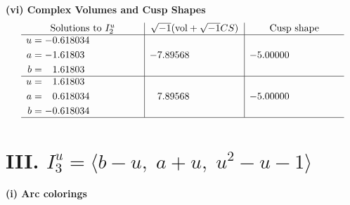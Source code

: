 \documentclass[1p]{elsarticle_modified}
\theoremstyle{definition}
\newcommand{\I}{\sqrt{-1}}
\begin{document}
\newpage\flushleft \textbf{(vi) Complex Volumes and Cusp Shapes}
$$\begin{array}{c|c|c}  
\text{Solutions to }I^u_{2}& \I (\text{vol} + \sqrt{-1}CS) & \text{Cusp shape}\\
 \hline 
\begin{aligned}
u &= -0.618034\phantom{ +0.000000I} \\
a &= -1.61803\phantom{ +0.000000I} \\
b &= \phantom{-}1.61803\phantom{ +0.000000I}\end{aligned}
 & -7.89568\phantom{ +0.000000I} & -5.00000\phantom{ +0.000000I} \\ \hline\begin{aligned}
u &= \phantom{-}1.61803\phantom{ +0.000000I} \\
a &= \phantom{-}0.618034\phantom{ +0.000000I} \\
b &= -0.618034\phantom{ +0.000000I}\end{aligned}
 & \phantom{-}7.89568\phantom{ +0.000000I} & -5.00000\phantom{ +0.000000I}\\
 \hline 
 \end{array}$$\newpage\newpage\renewcommand{\arraystretch}{1}
\centering \section*{III. $I^u_{3}= \langle b- u,\;a+u,\;u^2- u-1 \rangle$}
\flushleft \textbf{(i) Arc colorings}\\
\end{document}
